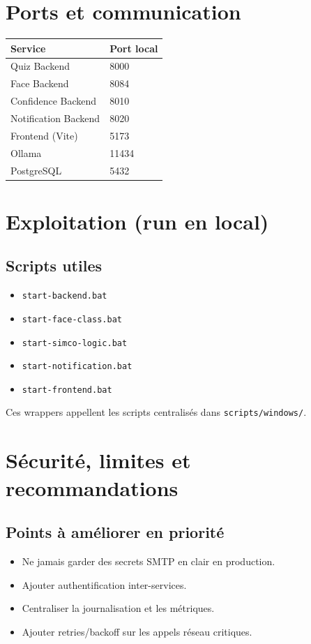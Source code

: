 \documentclass[12pt,a4paper]{article}
\begin{document}
\section{Ports et communication}
\begin{longtable}{p{6cm} p{6cm}}
\toprule
\textbf{Service} & \textbf{Port local} \\
\midrule
Quiz Backend & 8000 \\
Face Backend & 8084 \\
Confidence Backend & 8010 \\
Notification Backend & 8020 \\
Frontend (Vite) & 5173 \\
Ollama & 11434 \\
PostgreSQL & 5432 \\
\bottomrule
\end{longtable}

\section{Exploitation (run en local)}
\subsection{Scripts utiles}
\begin{itemize}
    \item \texttt{start-backend.bat}
    \item \texttt{start-face-class.bat}
    \item \texttt{start-simco-logic.bat}
    \item \texttt{start-notification.bat}
    \item \texttt{start-frontend.bat}
\end{itemize}

Ces wrappers appellent les scripts centralis\'es dans \texttt{scripts/windows/}.

\section{S\'ecurit\'e, limites et recommandations}
\subsection{Points \`a am\'eliorer en priorit\'e}
\begin{itemize}
    \item Ne jamais garder des secrets SMTP en clair en production.
    \item Ajouter authentification inter-services.
    \item Centraliser la journalisation et les m\'etriques.
    \item Ajouter retries/backoff sur les appels r\'eseau critiques.
\end{itemize}
\end{document}
